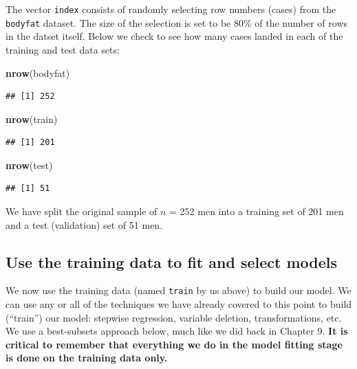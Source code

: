 \documentclass[
]{book}
\newenvironment{Shaded}{\begin{snugshade}}{\end{snugshade}}
\newcommand{\FunctionTok}[1]{\textcolor[rgb]{0.13,0.29,0.53}{\textbf{#1}}}
\newcommand{\NormalTok}[1]{#1}
\begin{document}
The vector \texttt{index} consists of randomly selecting row numbers (cases) from the \texttt{bodyfat} dataset. The size of the selection is set to be 80\% of the number of rows in the datset itself. Below we check to see how many cases landed in each of the training and test data sets:

\begin{Shaded}
\begin{Highlighting}[]
\FunctionTok{nrow}\NormalTok{(bodyfat)}
\end{Highlighting}
\end{Shaded}

\begin{verbatim}
## [1] 252
\end{verbatim}

\begin{Shaded}
\begin{Highlighting}[]
\FunctionTok{nrow}\NormalTok{(train)}
\end{Highlighting}
\end{Shaded}

\begin{verbatim}
## [1] 201
\end{verbatim}

\begin{Shaded}
\begin{Highlighting}[]
\FunctionTok{nrow}\NormalTok{(test)}
\end{Highlighting}
\end{Shaded}

\begin{verbatim}
## [1] 51
\end{verbatim}

We have split the original sample of \(n\) = 252 men into a training set of 201 men and a test (validation) set of 51 men.

\hypertarget{use-the-training-data-to-fit-and-select-models}{%
\subsection{Use the training data to fit and select models}\label{use-the-training-data-to-fit-and-select-models}}

We now use the training data (named \texttt{train} by us above) to build our model. We can use any or all of the techniques we have already covered to this point to build (``train'') our model: stepwise regression, variable deletion, transformations, etc. We use a best-subsets approach below, much like we did back in Chapter 9. \textbf{It is critical to remember that everything we do in the model fitting stage is done on the training data only.}
\end{document}
